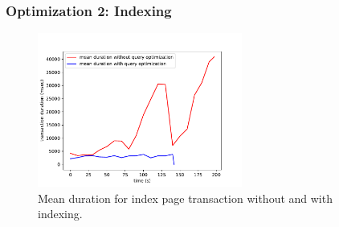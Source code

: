 \begin{frame}
\frametitle{Optimization 2: Indexing}
\begin{figure}
	\centering
	\includegraphics[width=0.6\textwidth, height=0.6\textheight]{images/list-pages-transaction-duration-without-query-with-query}
	\caption{Mean duration for index page transaction without and with indexing.}\label{fig:sqlopt}

\end{figure}
\end{frame}
